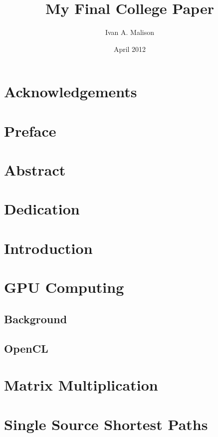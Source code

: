 \documentclass[12pt,twoside]{reedthesis}
\title{My Final College Paper}
\author{Ivan A. Malison}
\date{April 2012}
\begin{document}
  \maketitle
  \frontmatter 
  \pagestyle{empty}

  \chapter*{Acknowledgements}

    \chapter*{Preface}

    \tableofcontents

    \chapter*{Abstract}
	
	\chapter*{Dedication}

  \mainmatter 
  \pagestyle{fancyplain}

    \chapter*{Introduction}

\chapter{GPU Computing}
\section{Background}
\section{OpenCL}

\chapter{Matrix Multiplication}
\chapter{Single Source Shortest Paths}
\end{document}
